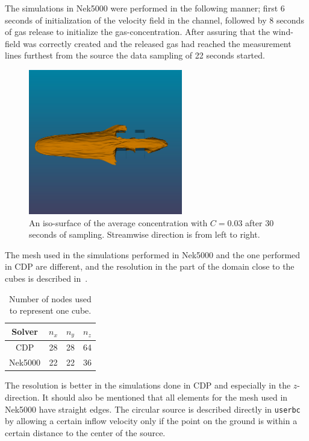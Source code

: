 The simulations in Nek5000 were performed in the following manner; first 6 seconds of initialization of the velocity field in the 
channel, followed by 8 seconds of gas release to initialize the gas-concentration. After assuring that the wind-field was 
correctly created and the released gas had reached the measurement lines furthest from the source the data sampling of 22 seconds 
started.
%
\begin{figure}[h]
	\centering
	\includegraphics[width=0.6\textwidth]{Figures/plume2.png}
	\caption{An iso-surface of the average concentration with $C=0.03$ 
    after 30 seconds of sampling. Streamwise direction is from left to right.}
	\label{fig:plume}
\end{figure}
%

The mesh used in the simulations performed in Nek5000 and the one performed in CDP are 
different, and the resolution in the part of the domain close to the cubes is described 
in~.
\begin{table}
    \centering
    \begin{tabular}{c| c c c}
        Solver   & $n_x$& $n_y$ & $n_z$ \\ \hline
        CDP      & 28 & 28 & 64 \\ 
        Nek5000  & 22 & 22 & 36 
    \end{tabular}
    \caption{Number of nodes used to represent one cube.}
    \label{tab:meshdiff}
\end{table}

The resolution is better in the simulations done in CDP and especially in 
the $z$-direction. It should also be mentioned that all elements for the mesh used in Nek5000
have straight edges. The circular source is described directly in \verb|userbc| by allowing 
a certain inflow velocity only if the point on the ground is within a certain distance 
to the center of the source.

